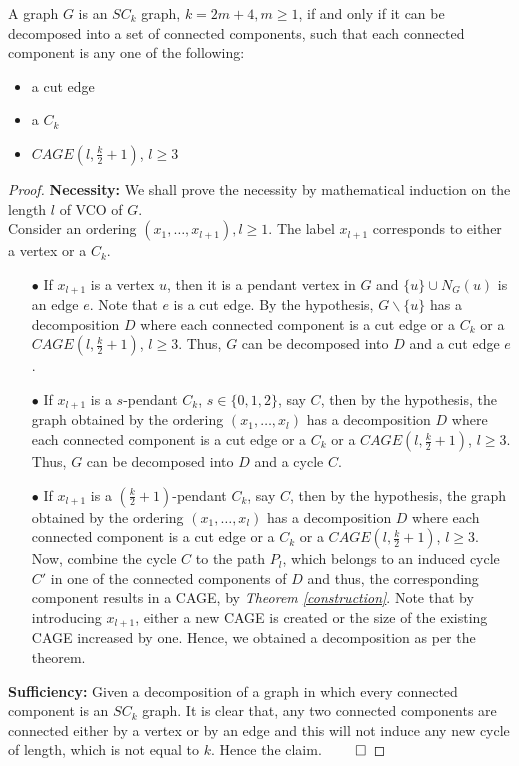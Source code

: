 \documentclass[runningheads]{llncs}
\begin{document}
\begin{theorem}
\label{decompositionsc2k}
A graph $G$ is an $SC_{k}$ graph, $k = 2m +4, m \geq 1$, if and only if it can be decomposed into a set of connected components, such that each connected component is any one of the following: 
\begin{itemize}
\item a cut edge
\item a $C_{k}$
\item $CAGE(l, \frac{k}{2}+1)$, $l \geq 3$
\end{itemize}
\end{theorem}
\begin{proof}
\textbf{Necessity:} We shall prove the necessity by mathematical induction on the length $l$ of VCO of $G$.\\
\noindent Consider an ordering $(x_1,\ldots,x_{l+1}), l\geq 1$. The label $x_{l+1}$ corresponds to either a vertex or a $C_k$. 
\begin{itemize}
\item[$\bullet$] 
If $x_{l+1}$ is a vertex $u$, then it is a pendant vertex in $G$ and $\{u\} \cup N_G(u)$ is an edge $e$. Note that $e$ is a cut edge. By the hypothesis, $G\backslash \{u\}$ has a decomposition $D$ where each connected component is a cut edge or a $C_k$ or a $CAGE(l, \frac{k}{2}+1)$, $l \geq 3$. Thus, $G$ can be decomposed into $D$ and a cut edge $e$.

\item[$\bullet$] 
If $x_{l+1}$ is a $s$-pendant $C_k$, $s \in \{0,1,2\}$, say $C$, then by the hypothesis, the graph obtained by the ordering $(x_1,\ldots,x_l)$ has a decomposition $D$ where each connected component is a cut edge or a $C_k$ or a $CAGE(l, \frac{k}{2}+1)$, $l \geq 3$. Thus, $G$ can be decomposed into $D$ and a cycle $C$.

\item[$\bullet$] 
If $x_{l+1}$ is a $(\frac{k}{2}+1)$-pendant $C_k$, say $C$, then by the hypothesis, the graph obtained by the ordering $(x_1,\ldots,x_l)$ has a decomposition $D$ where each connected component is a cut edge or a $C_k$ or a $CAGE(l, \frac{k}{2}+1)$, $l \geq 3$. Now, combine the cycle $C$ to the path $P_l$, which belongs to an induced cycle $C'$ in one of the connected components of $D$ and thus, the corresponding component results in a CAGE, by \emph{Theorem \ref{construction}}. Note that by introducing $x_{l+1}$, either a new CAGE is created or the size of the existing CAGE increased by one. Hence, we obtained a decomposition as per the theorem.

\end{itemize}

\noindent \textbf{Sufficiency:} Given a decomposition of a graph in which every connected component is an $SC_k$ graph. It is clear that, any two connected components are connected either by a vertex or by an edge and this will not induce any new cycle of length, which is not equal to $k$. Hence the claim. $\hfill \qed$
\end{proof}
\end{document}
